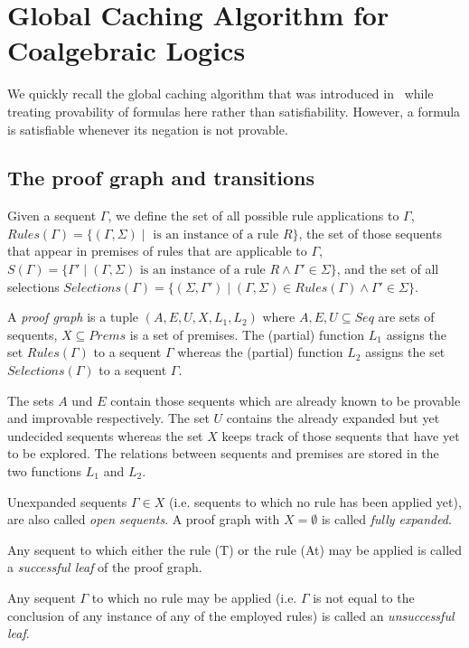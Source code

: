 \documentclass{llncs}
\begin{document}
\section{Global Caching Algorithm for Coalgebraic Logics}

We quickly recall the global caching algorithm that was introduced in~\cite{GoreEA10}
while treating provability of formulas here rather than satisfiability. However, a formula is 
satisfiable whenever its negation is not provable.

\subsection{The proof graph and transitions}

Given a sequent $\Gamma$, we define the set of all possible rule applications to $\Gamma$,
$Rules(\Gamma)=\{(\Gamma,\Sigma)\mid\text{ is an instance of a rule } R \}$, the set of
those sequents that appear in premises of rules that are applicable to $\Gamma$, $S(\Gamma)=
\{\Gamma'\mid(\Gamma,\Sigma)\text{ is an instance of a rule } R\wedge \Gamma'\in\Sigma\}$, 
and the set of all selections
$Selections(\Gamma)=\{(\Sigma,\Gamma')\mid (\Gamma,\Sigma)\in Rules(\Gamma)\wedge\Gamma'\in \Sigma\}$.

A \emph{proof graph} is a tuple $(A,E,U,X,L_1,L_2)$ where $A,E,U\subseteq Seq$ are sets of sequents,
$X\subseteq Prems$ is a set of premises. The (partial) function $L_1$ assigns the set $Rules(\Gamma)$ to a
sequent $\Gamma$ whereas the (partial) function $L_2$ assigns the set $Selections(\Gamma)$ to a sequent $\Gamma$.

The sets $A$ und $E$ contain those sequents which are already known to be provable and improvable respectively.
The set $U$ contains the already expanded but yet undecided sequents whereas the set $X$ keeps track
of those sequents that have yet to be explored. The relations between sequents and premises are stored
in the two functions $L_1$ and $L_2$.

Unexpanded sequents $\Gamma\in X$ (i.e. sequents to which no rule has been applied
yet), are also called \emph{open sequents}. A proof graph with $X=\emptyset$ is
called \emph{fully expanded}.

Any sequent to which either the rule (T) or the rule (At) may be applied
is called a \emph{successful leaf} of the proof graph.

Any sequent $\Gamma$ to which no rule may be applied (i.e. $\Gamma$ is not equal to the conclusion of any instance of any of
the employed rules) is called an \emph{unsuccessful leaf}.
\end{document}
